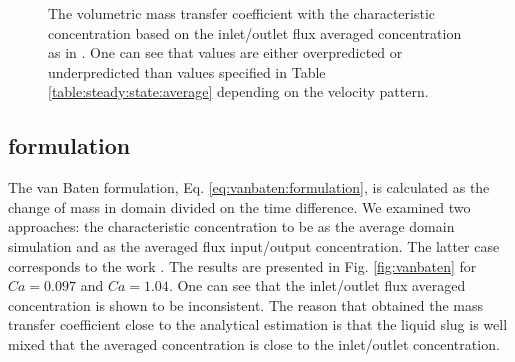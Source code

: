 \documentclass{article}
\begin{document}
\begin{figure}[htb!]
\caption{The volumetric mass transfer coefficient
with the characteristic concentration based on
the inlet/outlet flux averaged concentration as
in \cite{vanbaten-circular}. One can see that values are either overpredicted or underpredicted
than values specified in Table \ref{table:steady:state:average} depending on the velocity pattern. 
\label{fig:volumetric:char:concentration:vanbaten}}
\end{figure}

\subsection{\citeauthor{vanbaten-circular} formulation}
\label{results:vanbaten}
The van Baten formulation, Eq. \ref{eq:vanbaten:formulation}, is calculated as the change of mass in domain divided on the time difference. We examined two approaches:  the characteristic concentration to be as the average domain simulation and as the averaged flux input/output
concentration. The latter case corresponds to the work \cite{vanbaten-circular}. The results are presented in Fig. \ref{fig:vanbaten} for $Ca=0.097$ and
$Ca=1.04$. One can see that the
inlet/outlet
flux averaged concentration is shown to be inconsistent. The reason that \citet{vanbaten-circular} obtained the mass transfer coefficient close to the analytical estimation is that the liquid slug is well mixed that the averaged concentration is close to the inlet/outlet concentration.
\end{document}
